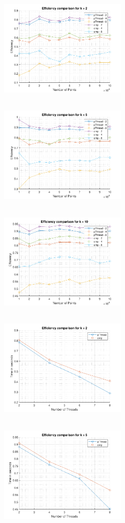 \documentclass[letter, 11pt, margin=1in]{article}
\begin{document}
\begin{figure}[h]
    \centering
    \includegraphics[width=6.2cm,height=5.5cm]{ek2}
    \includegraphics[width=6.2cm,height=5.5cm]{ek5}
    \includegraphics[width=6.2cm,height=5.5cm]{ek10}\\
    \includegraphics[width=6.2cm,height=5.5cm]{tek2}
    \includegraphics[width=6.2cm,height=5.5cm]{tek5}

\end{figure}
\end{document}
